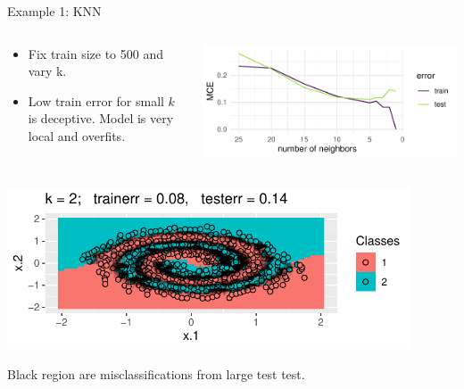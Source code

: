 \documentclass[11pt,compress,t,notes=noshow, xcolor=table]{beamer}
\begin{document}
\begin{vbframe}{Example 1: KNN}
\framebreak


\small






\begin{columns}
\begin{column}{0.6\textwidth}
\begin{itemize}
\item Fix train size to 500 and vary k.
\item Low train error for small $k$ is deceptive. Model is very local and overfits.
\end{itemize}
\end{column}
\begin{column}{0.4\textwidth}
\begin{center}
\includegraphics[width = \textwidth]{figure/eval_delta_train_test_overfit}
\end{center}
\end{column}
\end{columns}
\vfill
\begin{center}
\includegraphics[width = 0.90\textwidth]{figure/eval_delta_train_test_knn_2d}
\end{center}
Black region are misclassifications from large test test.
\end{vbframe}
\end{document}
